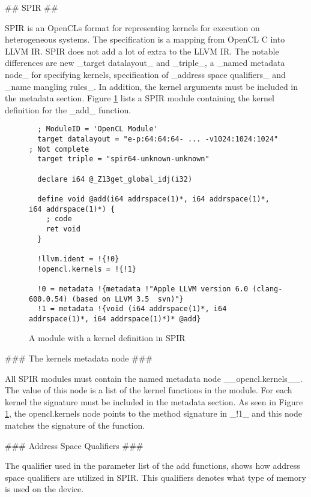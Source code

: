 \begin{markdown}
## SPIR ##

\gls{SPIR} is an \glspl{OpenCL} format for representing kernels for
execution on heterogeneous systems. The specification is a mapping
from OpenCL C into LLVM IR. SPIR does not add a lot of extra to the
LLVM IR. The notable differences are new _target datalayout_ and
_triple_, a _named metadata node_ for specifying kernels,
specification of _address space qualifiers_ and _name mangling
rules_. In addition, the kernel arguments must be included in the
metadata section. Figure \ref{fig:spir} lists a \gls{SPIR} module
containing the kernel definition for the _add_ function.


\begin{figure}[H]
  \begin{verbatim}
  ; ModuleID = 'OpenCL Module'
  target datalayout = "e-p:64:64:64- ... -v1024:1024:1024" ; Not complete
  target triple = "spir64-unknown-unknown"
  
  declare i64 @_Z13get_global_idj(i32)
  
  define void @add(i64 addrspace(1)*, i64 addrspace(1)*, i64 addrspace(1)*) {
    ; code
    ret void
  }
  
  !llvm.ident = !{!0}
  !opencl.kernels = !{!1}
  
  !0 = metadata !{metadata !"Apple LLVM version 6.0 (clang-600.0.54) (based on LLVM 3.5  svn)"}
  !1 = metadata !{void (i64 addrspace(1)*, i64 addrspace(1)*, i64 addrspace(1)*)* @add}
  \end{verbatim}
  \caption{A module with a kernel definition in SPIR}
  \label{fig:spir}
\end{figure}

### The kernels metadata node ###

All SPIR modules must contain the named metadata node
__opencl.kernels__. The value of this node is a list of the kernel
functions in the module. For each kernel the signature must be
included in the metadata section. As seen in Figure \ref{fig:spir},
the opencl.kernels node points to the method signature in _!1_ and
this node matches the signature of the function.

### Address Space Qualifiers ###

The qualifier used in the parameter list of the add functions, shows
how address space qualifiers are utilized in SPIR. This qualifiers
denotes what type of memory is used on the device.


\end{markdown}
